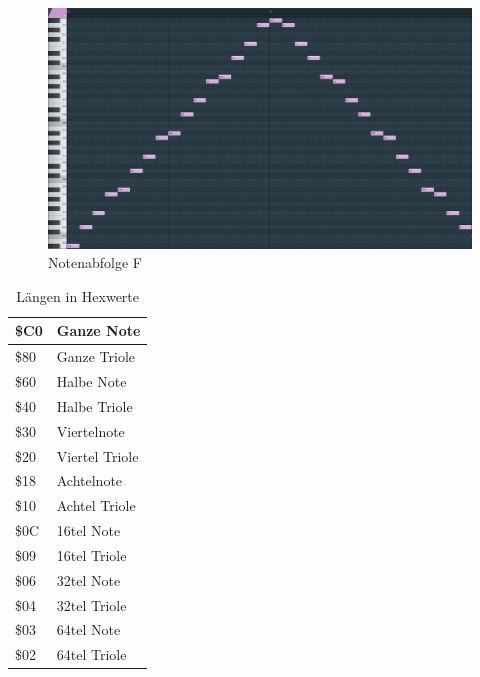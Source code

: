 \begin{figure}[htbp] \centering
	\includegraphics[width=.95\linewidth]{images/Noten_F.png}
	\caption{Notenabfolge F}
	\label{NotenabfolgeF}
\end{figure}


\begin{table}[htbp]
	\centering
	\begin{tabularx}{4.5cm}{|l|X|}
		\hline
		\$C0 & Ganze Note \\
		\hline
		\$80 & Ganze Triole \\
		\hline
		\$60 & Halbe Note \\
		\hline
		\$40 & Halbe Triole \\
		\hline
		\$30 & Viertelnote \\
		\hline
		\$20 & Viertel Triole \\
		\hline
		\$18 & Achtelnote \\
		\hline
		\$10 & Achtel Triole \\
		\hline
		\$0C & 16tel Note \\
		\hline
		\$09 & 16tel Triole \\
		\hline
		\$06 & 32tel Note \\
		\hline
		\$04 & 32tel Triole \\
		\hline
		\$03 & 64tel Note \\
		\hline
		\$02 & 64tel Triole \\
		\hline
	\end{tabularx}
	\caption{Längen in Hexwerte}
\end{table}

